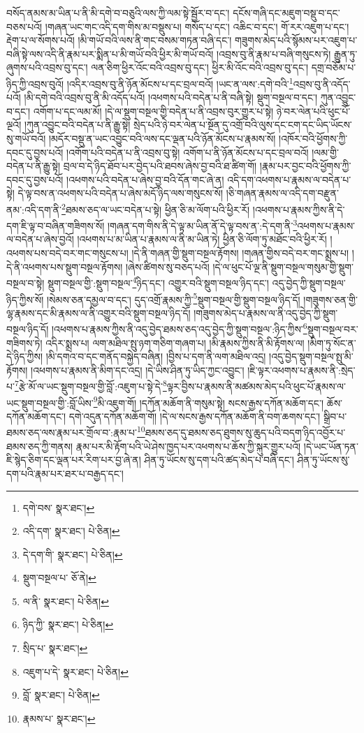 བསོད་ནམས་མ་ཡིན་པ་ནི་མི་དགེ་བ་བཅུའི་ལས་ཀྱི་ལམ་སྟེ་སྦྱོར་བ་དང་། དངོས་གཞི་དང་མཇུག་བསྡུ་བ་དང་བཅས་པའོ། །གཞན་ཡང་གང་འདི་དག་གིས་མ་བསྡུས་པ། གསོད་པ་དང་། འཆིང་བ་དང་། གོ་རར་འཇུག་པ་དང་། རྡེག་པ་ལ་སོགས་པའོ། །མི་གཡོ་བའི་ལས་ནི་གང་བསམ་གཏན་བཞི་དང་། གཟུགས་མེད་པའི་སྙོམས་པར་འཇུག་པ་བཞི་སྟེ་ལས་འདི་ནི་རྣམ་པར་སྨིན་པ་མི་གཡོ་བའི་ཕྱིར་མི་གཡོ་བའོ། །འབྲས་བུ་ནི་རྣམ་པ་བཞི་གསུངས་ཏེ། རྒྱུན་ཏུ་ཞུགས་པའི་འབྲས་བུ་དང་། ལན་ཅིག་ཕྱིར་འོང་བའི་འབྲས་བུ་དང་། ཕྱིར་མི་འོང་བའི་འབྲས་བུ་དང་། དགྲ་བཅོམ་པ་ཉིད་ཀྱི་འབྲས་བུའོ། །འདིར་འབྲས་བུ་ནི་ཉོན་མོངས་པ་དང་བྲལ་བའོ། །ཡང་ན་ལས་:དགེ་བའི་\footnote{དགེ་བས་  སྣར་ཐང་། }འབྲས་བུ་ནི་འདོད་པའོ། །མི་དགེ་བའི་འབྲས་བུ་ནི་མི་འདོད་པའོ། །འཕགས་པའི་བདེན་པ་ནི་བཞི་སྟེ། སྡུག་བསྔལ་བ་དང་། ཀུན་འབྱུང་བ་དང་། འགོག་པ་དང་ལམ་མོ། །དེ་ལ་སྡུག་བསྔལ་གྱི་བདེན་པ་ནི་འབྲས་བུར་གྱུར་པ་སྟེ། ཉེ་བར་ལེན་པའི་ཕུང་པོ་ལྔའོ། །ཀུན་འབྱུང་བའི་བདེན་པ་ནི་རྒྱུ་སྟེ། སྲེད་པའི་ཉེ་བར་ལེན་པ་སྔོན་དུ་འགྲོ་བའི་ལུས་དང་ངག་དང་ཡིད་ཡོངས་སུ་གཡོ་བའོ། །མདོར་བསྡུ་ན་ཡང་འབྱུང་བའི་ལས་དང་ལྡན་པའི་ཉོན་མོངས་པ་རྣམས་སོ། །འཁོར་བའི་ཕྱོགས་ཀྱི་དབང་དུ་བྱས་པའོ། །འགོག་པའི་བདེན་པ་ནི་འབྲས་བུ་སྟེ། འགོག་པ་ནི་ཉོན་མོངས་པ་དང་བྲལ་བའོ། །ལམ་གྱི་བདེན་པ་ནི་རྒྱུ་སྟེ། བྲལ་བ་དེ་ཉིད་ཐོབ་པར་བྱེད་པའི་ཐབས་ཞེས་བྱ་བའི་ཐ་ཚིག་གོ། །རྣམ་པར་བྱང་བའི་ཕྱོགས་ཀྱི་དབང་དུ་བྱས་པའོ། །འཕགས་པའི་བདེན་པ་ཞེས་བྱ་བའི་དོན་གང་ཞེ་ན། འདི་དག་འཕགས་པ་རྣམས་ལ་བདེན་པ་སྟེ། དེ་ལྟ་བས་ན་འཕགས་པའི་བདེན་པ་ཞེས་མདོ་ཉིད་ལས་གསུངས་སོ། །ཅི་གཞན་རྣམས་ལ་འདི་དག་བརྫུན་ནམ་:འདི་དག་ནི་\footnote{འདི་དག་  སྣར་ཐང་།  པེ་ཅིན། }ཐམས་ཅད་ལ་ཡང་བདེན་པ་སྟེ། ཕྱིན་ཅི་མ་ལོག་པའི་ཕྱིར་རོ། །འཕགས་པ་རྣམས་ཀྱིས་ནི་དེ་དག་ཇི་ལྟ་བ་བཞིན་གཟིགས་སོ། །གཞན་དག་གིས་ནི་དེ་ལྟ་མ་ཡིན་ནོ་དེ་ལྟ་བས་ན་:དེ་དག་ནི་\footnote{དེ་དག་གི་  སྣར་ཐང་།  པེ་ཅིན། }འཕགས་པ་རྣམས་ལ་བདེན་པ་ཞེས་བྱའོ། །འཕགས་པ་མ་ཡིན་པ་རྣམས་ལ་ནི་མ་ཡིན་ཏེ། ཕྱིན་ཅི་ལོག་ཏུ་མཐོང་བའི་ཕྱིར་རོ། །འཕགས་པས་བདེ་བར་གང་གསུངས་པ། །དེ་ནི་གཞན་གྱི་སྡུག་བསྔལ་རྟོགས། །གཞན་གྱིས་བདེ་བར་གང་སྨྲས་པ། །དེ་ནི་འཕགས་པས་སྡུག་བསྔལ་རྟོགས། །ཞེས་ཚིགས་སུ་བཅད་པའོ། །དེ་ལ་ཕུང་པོ་ལྔ་ནི་སྡུག་བསྔལ་གསུམ་གྱི་སྡུག་བསྔལ་བ་སྟེ། སྡུག་བསྔལ་གྱི་:སྡུག་བསྔལ་\footnote{སྡུག་བསྔལ་པ་  ཅོ་ནེ། }ཉིད་དང་། འགྱུར་བའི་སྡུག་བསྔལ་ཉིད་དང་། འདུ་བྱེད་ཀྱི་སྡུག་བསྔལ་ཉིད་ཀྱིས་སོ། །སེམས་ཅན་དམྱལ་བ་དང་། དུད་འགྲོ་རྣམས་ཀྱི་\footnote{ལ་ནི་  སྣར་ཐང་།  པེ་ཅིན། }སྡུག་བསྔལ་གྱི་སྡུག་བསྔལ་ཉིད་དོ། །གཟུགས་ཅན་གྱི་ལྷ་རྣམས་དང་མི་རྣམས་ལ་ནི་འགྱུར་བའི་སྡུག་བསྔལ་ཉིད་དོ། །གཟུགས་མེད་པ་རྣམས་ལ་ནི་འདུ་བྱེད་ཀྱི་སྡུག་བསྔལ་ཉིད་དོ། །འཕགས་པ་རྣམས་ཀྱིས་ནི་འདུ་བྱེད་ཐམས་ཅད་འདུ་བྱེད་ཀྱི་སྡུག་བསྔལ་:ཉིད་ཀྱིས་\footnote{ཉིད་ཀྱི་  སྣར་ཐང་།  པེ་ཅིན། }སྡུག་བསྔལ་བར་གཟིགས་ཏེ། འདིར་སྨྲས་པ། ལག་མཐིལ་སྤུ་ཉག་གཅིག་གཞག་པ། །མི་རྣམས་ཀྱིས་ནི་མི་རྟོགས་ལ། །མིག་ཏུ་སོང་ན་དེ་ཉིད་ཀྱིས། །མི་དགའ་བ་དང་གནོད་བསྐྱེད་བཞིན། །བྱིས་པ་དག་ནི་ལག་མཐིལ་འདྲ། །འདུ་བྱེད་སྡུག་བསྔལ་སྤུ་མི་རྟོགས། །འཕགས་པ་རྣམས་ནི་མིག་དང་འདྲ། །དེ་ཡིས་ཤིན་ཏུ་ཡིད་ཀྱང་འབྱུང་། །ཇི་ལྟར་འཕགས་པ་རྣམས་ནི་:སྲེད་པ་\footnote{སྲིད་པ་  སྣར་ཐང་། }རྩེ་མོ་ལ་ཡང་སྡུག་བསྔལ་གྱི་བློ་:འཇུག་པ་སྟེ་དེ་\footnote{འཇུག་པ་དེ་  སྣར་ཐང་།  པེ་ཅིན། }ལྟར་བྱིས་པ་རྣམས་ནི་མཚམས་མེད་པའི་ཕུང་པོ་རྣམས་ལ་ཡང་སྡུག་བསྔལ་གྱི་:བློ་ཡིས་\footnote{བློ་  སྣར་ཐང་།  པེ་ཅིན། }མི་འཇུག་གོ། །དཀོན་མཆོག་ནི་གསུམ་སྟེ། སངས་རྒྱས་དཀོན་མཆོག་དང་། ཆོས་དཀོན་མཆོག་དང་། དགེ་འདུན་དཀོན་མཆོག་གོ། །དེ་ལ་སངས་རྒྱས་དཀོན་མཆོག་ནི་བག་ཆགས་དང་། སྒྲིབ་པ་ཐམས་ཅད་ལས་རྣམ་པར་གྲོལ་བ་:རྣམ་པ་\footnote{རྣམས་པ་  སྣར་ཐང་། }ཐམས་ཅད་དུ་ཐམས་ཅད་ཐུགས་སུ་ཆུད་པའི་བདག་ཉིད་འབྱོར་པ་ཐམས་ཅད་ཀྱི་གནས། རྣམ་པར་མི་རྟོག་པའི་ཡེ་ཤེས་ཁྱད་པར་འཕགས་པ་ཆོས་ཀྱི་སྐུར་གྱུར་པའོ། །དེ་ཡང་ཡོན་ཏན་ཇི་སྙེད་ཅིག་དང་ལྡན་པར་རིག་པར་བྱ་ཞེ་ན། ཤིན་ཏུ་ཡོངས་སུ་དག་པའི་ཚད་མེད་པ་བཞི་དང་། ཤིན་ཏུ་ཡོངས་སུ་དག་པའི་རྣམ་པར་ཐར་པ་བརྒྱད་དང་། 